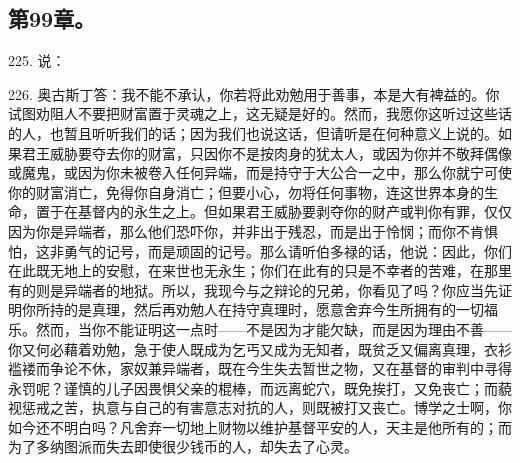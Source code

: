
\subsection{第99章。}

225. 说：\par

226. 奥古斯丁答：我不能不承认，你若将此劝勉用于善事，本是大有裨益的。你试图劝阻人不要把财富置于灵魂之上，这无疑是好的。然而，我愿你这听过这些话的人，也暂且听听我们的话；因为我们也说这话，但请听是在何种意义上说的。如果君王威胁要夺去你的财富，只因你不是按肉身的犹太人，或因为你并不敬拜偶像或魔鬼，或因为你未被卷入任何异端，而是持守于大公合一之中，那么你就宁可使你的财富消亡，免得你自身消亡；但要小心，勿将任何事物，连这世界本身的生命，置于在基督内的永生之上。但如果君王威胁要剥夺你的财产或判你有罪，仅仅因为你是异端者，那么他们恐吓你，并非出于残忍，而是出于怜悯；而你不肯惧怕，这非勇气的记号，而是顽固的记号。那么请听伯多禄的话，他说：因此，你们在此既无地上的安慰，在来世也无永生；你们在此有的只是不幸者的苦难，在那里有的则是异端者的地狱。所以，我现今与之辩论的兄弟，你看见了吗？你应当先证明你所持的是真理，然后再劝勉人在持守真理时，愿意舍弃今生所拥有的一切福乐。然而，当你不能证明这一点时——不是因为才能欠缺，而是因为理由不善——你又何必藉着劝勉，急于使人既成为乞丐又成为无知者，既贫乏又偏离真理，衣衫褴褛而争论不休，家奴兼异端者，既在今生失去暂世之物，又在基督的审判中寻得永罚呢？谨慎的儿子因畏惧父亲的棍棒，而远离蛇穴，既免挨打，又免丧亡；而藐视惩戒之苦，执意与自己的有害意志对抗的人，则既被打又丧亡。博学之士啊，你如今还不明白吗？凡舍弃一切地上财物以维护基督平安的人，天主是他所有的；而为了多纳图派而失去即使很少钱币的人，却失去了心灵。\par

